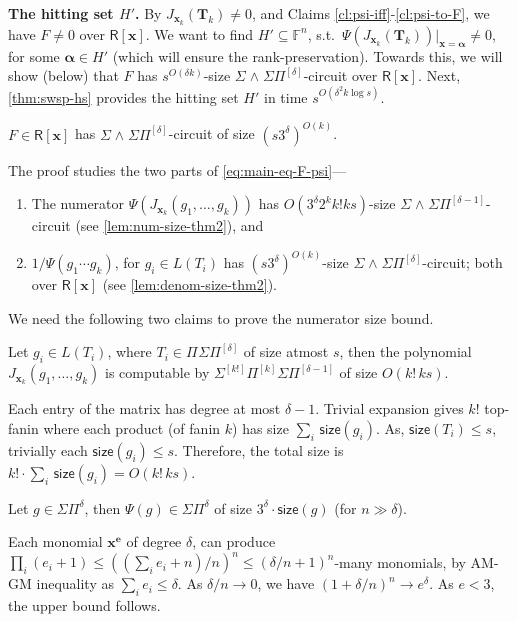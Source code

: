 \documentclass[10pt,a4paper]{article}
\newcommand{\F}{\mathbb{F}}
\newcommand{\ringR}{\mathsf{R}}
\newcommand{\x}{{\boldsymbol x}}
\newcommand{\alphavec}{\boldsymbol \alpha}
\newcommand{\T}{{\boldsymbol T}}
\newcommand{\e}{{\boldsymbol e}}
\newcommand{\size}{\mathsf{size}}
\newcommand{\PSP}[2]{\Pi^{#1}\Sigma\Pi^{#2}}
\newcommand{\SPSP}[3]{\Sigma^{#1}\Pi^{#2}\Sigma\Pi^{#3}}
\newcommand{\SWSP}[3]{\Sigma^{#1}\!\wedge^{#2}\!\Sigma\Pi^{#3}}
\numberwithin{equation}{section}
\newenvironment{proof-sketch}{\medskip\noindent{\em Proof Sketch.}}{\qed\bigskip}
\begin{document}
\textbf{The hitting set $H'$.} By $J_{\x_k}(\T_k) \ne 0$, and Claims \ref{cl:psi-iff}-\ref{cl:psi-to-F}, we have $F \ne 0$ over $\ringR[\x]$. We want to find $H' \subseteq \F^{n}$, s.t.~$\Psi(J_{\x_k}(\T_k))\rvert_{\x=\alphavec} \ne 0$, for some $\alphavec \in H'$ (which will ensure the rank-preservation). 
Towards this, we will show (below) that $F$ has $s^{O(\delta k)}$-size $\SWSP{}{}{[\delta]}$-circuit over $\ringR[\x]$. Next, \autoref{thm:swsp-hs} provides the hitting set $H'$ in time $s^{O(\delta^2 k \log s)}$. 


%

\begin{claim}\label{claim:small-size-F-swsp}
$F \in \ringR[\x]$ has $\SWSP{}{}{[\delta]}$-circuit of size $ (s3^{\delta})^{O(k)}$.
\end{claim}

%
\noindent The proof studies the two parts of \autoref{eq:main-eq-F-psi}---
\begin{enumerate}
    \item The numerator $\Psi(J_{{\x}_k}(g_1,\hdots,g_k))$ has $O(3^{\delta}2^kk!ks)$-size $\SWSP{}{}{[\delta-1]}$-circuit (see \autoref{lem:num-size-thm2}), and
    \item $1/\Psi(g_1 \cdots g_k)$, for $g_i \in L(T_i)$ has $(s3^{\delta})^{O(k)}$-size $\SWSP{}{}{[\delta]}$-circuit; both over $\ringR[\x]$ (see \autoref{lem:denom-size-thm2}).
\end{enumerate}

\noindent We need the following two claims to prove the numerator size bound.

\begin{claim}\label{claim:jacobiansize}
    Let $g_i \in L(T_i)$, where $T_i \in \PSP{}{[\delta]}$ of size atmost $s$, then the polynomial $J_{{\x}_k}(g_1,\hdots,g_k)$ is computable by $\SPSP{[k!]}{[k]}{[\delta-1]}$ of size $O(k!\,ks)$.
\end{claim}
    
\begin{proof-sketch}
    Each entry of the matrix has degree at most $\delta-1$. Trivial expansion gives $k!$ top-fanin where each product (of fanin $k$) has size $\sum_{i}\,\size(g_i)$. As, $\size(T_i) \le s$, trivially each $\size(g_i) \le s$. Therefore, the total size is $k! \cdot\sum_{i}\,\size(g_i)=O(k!\,ks)$.
\end{proof-sketch}
    
\begin{claim} \label{claim:size-g}
    Let $g \in \Sigma \Pi^{\delta}$, then $\Psi(g) \in \Sigma \Pi^{\delta}$ of size $3^{\delta} \cdot \size(g)$ (for $n\gg\delta$).
\end{claim}
\begin{proof-sketch}
    Each monomial $\x^{\e}$ of degree $\delta$, can produce $\prod_i (e_i+1) \le ((\sum_{i} e_i +n)/n)^n \le (\delta/n+1)^n$-many monomials, by AM-GM inequality as $\sum_{i} e_i \le \delta$. As $\delta/ n \rightarrow 0$, we have $(1+\delta/n)^n \rightarrow e^{\delta}$. As $e < 3$, the upper bound follows.
\end{proof-sketch}
\end{document}
